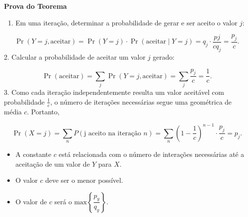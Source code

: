 \documentclass[
  letterpaper,
  DIV=11,
  numbers=noendperiod]{scrreprt}
\providecommand{\tightlist}{%
  \setlength{\itemsep}{0pt}\setlength{\parskip}{0pt}}\usepackage{longtable,booktabs,array}
\begin{document}
\begin{tcolorbox}[enhanced jigsaw, left=2mm, rightrule=.15mm, toprule=.15mm, opacityback=0, leftrule=.75mm, colframe=quarto-callout-note-color-frame, colback=white, breakable, arc=.35mm, bottomrule=.15mm]

\vspace{-3mm}\textbf{Prova do Teorema}\vspace{3mm}

\begin{enumerate}
\def\labelenumi{\arabic{enumi}.}
\tightlist
\item
  Em uma iteração, determinar a probabilidade de gerar e ser aceito o
  valor \(j\):
\end{enumerate}

\[\Pr(Y=j,\text{aceitar})= \Pr(Y=j) \cdot \Pr(\text{aceitar}\mid Y=j)= q_j\cdot \dfrac{pj}{cq_j} = \dfrac{p_j}{c}.\]
2. Calcular a probabilidade de aceitar um valor \(j\) gerado:

\[\Pr(\text{aceitar})= \sum_j \Pr(Y=j,\text{aceitar})=\sum_j \dfrac{p_j}{c} = \dfrac{1}{c}.\]
3. Como cada iteração independentemente resulta um valor aceitável com
probabilidade \(\frac{1}{c}\), o número de iterações necessárias segue
uma geométrica de média \(c\). Portanto,

\[\Pr(X=j)=\! \sum_n P(\text{j aceito na iteração $n$}) = \sum_n \left(1-\dfrac{1}{c}\right)^{n-1}\cdot\dfrac{p_j}{c}=p_j.\]

\end{tcolorbox}

\begin{tcolorbox}[enhanced jigsaw, left=2mm, toprule=.15mm, opacityback=0, title={Observações}, leftrule=.75mm, breakable, colbacktitle=quarto-callout-important-color!10!white, coltitle=black, rightrule=.15mm, bottomtitle=1mm, toptitle=1mm, colframe=quarto-callout-important-color-frame, colback=white, opacitybacktitle=0.6, bottomrule=.15mm, arc=.35mm, titlerule=0mm]

\begin{itemize}
\item
  A constante \(c\) está relacionada com o número de interações
  necessárias até a aceitação de um valor de \(Y\) para \(X\).
\item
  O valor \(c\) deve ser o menor possível.
\item
  O valor de \(c\) será o \(\mbox{max}\left\{\dfrac{p_y}{q_y}\right\}\).
\end{itemize}

\end{tcolorbox}
\end{document}
